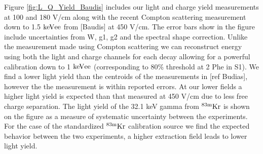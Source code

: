 Figure \ref{fig:L_Q_Yield_Baudis} includes our light and charge yield measurements at 100 and 180 V/cm along with the recent Compton scattering measurement down to 1.5 $\rm keV{ee}$ from [Baudis] at 450 V/cm. The error bars show in the figure include uncertainties from W, g1, g2 and the spectral shape correction. Unlike the measurement made using Compton scattering we can reconstruct energy using both the light and charge channels for each decay allowing for a powerful calibration down to 1 $\rm keV{ee}$ (corresponding to 80\% threshold at 2 Phe in S1).  We find a lower light yield than the centroids of the measurements in [ref Budias], however the the measurement is within reported errors. At our lower fields a higher light yield is expected than that measured at 450 V/cm due to less free charge separation.  The light yield of the 32.1 keV gamma from $\rm^{83m}Kr$ is shown on the figure as a measure of systematic uncertainty between the experiments. For the case of the standardized $\rm^{83m}Kr$ calibration source we find the expected behavior between the two experiments, a higher extraction field leads to lower light yield.



